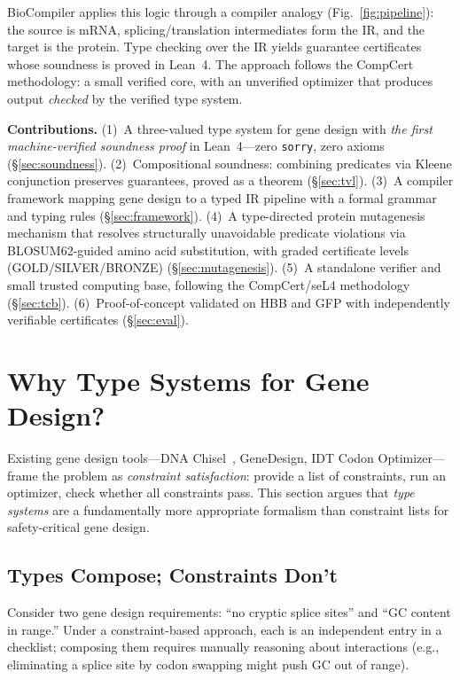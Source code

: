 \documentclass[runningheads]{llncs}
\begin{document}
BioCompiler applies this logic through a compiler analogy (Fig.~\ref{fig:pipeline}): the source is mRNA, splicing/translation intermediates form the IR, and the target is the protein.
Type checking over the IR yields guarantee certificates whose soundness is proved in Lean~4.
The approach follows the CompCert~\cite{leroy2009compcert} methodology: a small verified core, with an unverified optimizer that produces output \emph{checked} by the verified type system.

\smallskip\noindent\textbf{Contributions.}
(1)~A three-valued type system for gene design with \emph{the first machine-verified soundness proof} in Lean~4---zero \texttt{sorry}, zero axioms (\S\ref{sec:soundness}).
(2)~Compositional soundness: combining predicates via Kleene conjunction preserves guarantees, proved as a theorem (\S\ref{sec:tvl}).
(3)~A compiler framework mapping gene design to a typed IR pipeline with a formal grammar and typing rules (\S\ref{sec:framework}).
(4)~A type-directed protein mutagenesis mechanism that resolves structurally unavoidable predicate violations via BLOSUM62-guided amino acid substitution, with graded certificate levels (GOLD/SILVER/BRONZE) (\S\ref{sec:mutagenesis}).
(5)~A standalone verifier and small trusted computing base, following the CompCert/seL4 methodology (\S\ref{sec:tcb}).
(6)~Proof-of-concept validated on HBB and GFP with independently verifiable certificates (\S\ref{sec:eval}).

\section{Why Type Systems for Gene Design?}\label{sec:whytvs}

Existing gene design tools---DNA Chisel~\cite{piret2020dnachisel}, GeneDesign, IDT Codon Optimizer---frame the problem as \emph{constraint satisfaction}: provide a list of constraints, run an optimizer, check whether all constraints pass.
This section argues that \emph{type systems} are a fundamentally more appropriate formalism than constraint lists for safety-critical gene design.

\subsection{Types Compose; Constraints Don't}

Consider two gene design requirements: ``no cryptic splice sites'' and ``GC content in range.''
Under a constraint-based approach, each is an independent entry in a checklist; composing them requires manually reasoning about interactions (e.g., eliminating a splice site by codon swapping might push GC out of range).
\end{document}
